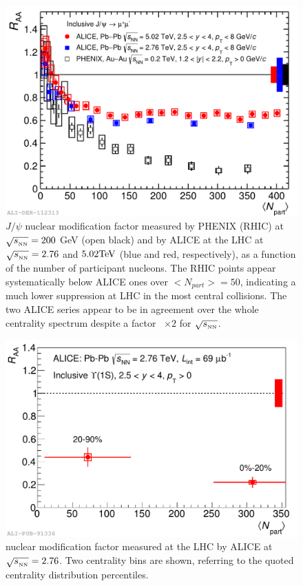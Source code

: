 \begin{figure}[!t]
\begin{center}
\includegraphics[width=0.8\linewidth]{Chapters/Analysis/Figs/2016-Sep-15-RAA_centr_Alice5_Alice276_Phenix.pdf}
\caption{$J/\psi$ nuclear modification factor measured by PHENIX (RHIC) at $\sqrt{s_{_{\rm NN}}}=200$ GeV (open black) and by ALICE at the LHC at $\sqrt{s_{_{\rm NN}}}=2.76$ and $5.02 \rm{TeV}$ (blue and red, respectively), as a function of the number of participant nucleons. The RHIC points appear systematically below ALICE ones over $<N_{part}>=50$, indicating a much lower suppression at LHC in the most central collisions. The two ALICE series appear to be in agreement over the whole centrality spectrum despite a factor ~$\times2$ for $\sqrt{s_{_{\rm NN}}}$. }
\label{fig:LHC_RHIC_jpsi}
\end{center}
\end{figure}

\begin{figure}[!t]
\begin{center}
\includegraphics[width=0.8\linewidth]{Chapters/Analysis/Figs/2014-Dec-16-Raa_centr.pdf}
\caption{\upsi nuclear modification factor measured at the LHC by ALICE at $\sqrt{s_{_{\rm NN}}}=2.76$. Two centrality bins are shown, referring to the quoted centrality distribution percentiles.}
\label{fig:LHC_upsi}
\end{center}
\end{figure}

